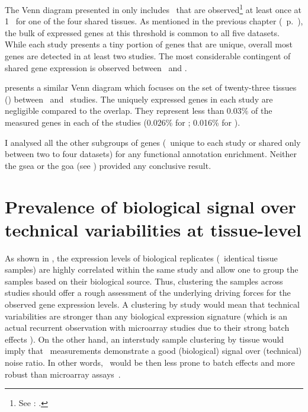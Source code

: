 The Venn diagram presented in  only includes \pcgs\
that are observed\footnote{See
: .}
at least once at 1 \FPKM\ for one of the four shared tissues.
As mentioned in the previous chapter (~p.~\pageref{def:trep}),
the bulk of expressed genes at this threshold is common
to all five datasets.
While each study presents a tiny portion of genes
that are unique,
overall most genes are detected in at least two studies.
The most considerable contingent of shared gene expression is observed
between \uhlen\ and \gtex.\mybr\

 presents a similar Venn diagram
which focuses on the set of twenty-three tissues (\setTwo)
between \uhlen\ and \gtex\ studies.
The uniquely expressed genes in each study are negligible compared to the overlap.
They represent less than 0.03\% of the measured genes in each of the studies
(0.026\% for \uhlen; 0.016\% for \gtex).\mybr\
\begin{comment}
    Gtex:   462/17551 hence 0.02632329\%
    Uhlen:  281/17551 hence 0.01601048\%
\end{comment}

I analysed all the other subgroups of genes
(\ie\ unique to each study or shared only between two to four datasets)
for any functional annotation enrichment.
Neither the \gls{gsea} or the \gls{goa}
(see \Cref{sec:enrichmentAnalysis})
provided any conclusive result.\mybr\

\section{Prevalence of biological signal over technical variabilities at
tissue-level}\label{sec:Trans_ReproExpresTissue}

As shown in ,
the expression levels of biological replicates (\ie\ identical tissue samples)
are highly correlated within the same study
and allow one to group the samples based on their biological source.
Thus, clustering the samples across studies should offer a rough assessment of
the underlying driving forces for the observed gene expression levels.
A clustering by study would mean that technical variabilities are stronger
than any biological expression signature
(which is an actual recurrent observation with microarray studies
due to their strong batch effects ).
On the other hand,
an interstudy sample clustering by tissue would imply that \Rnaseq\ measurements
demonstrate a good (biological) signal over (technical) noise ratio.
In other words,
\Rnaseq\ would be then less prone to batch effects and more robust than
microarray assays~.\mybr\

